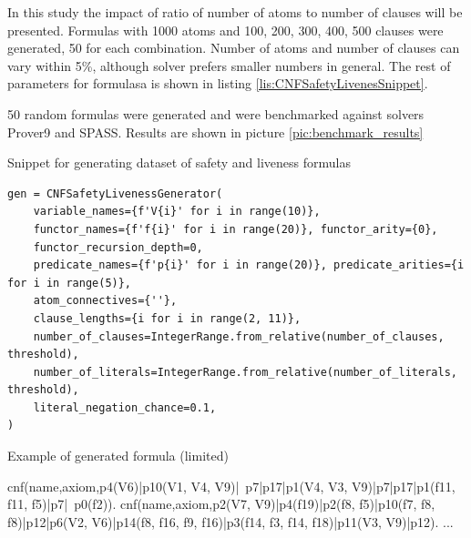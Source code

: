 In this study the impact of ratio of number of atoms to number of clauses will be presented.
Formulas with 1000 atoms and 100, 200, 300, 400, 500 clauses were generated, 50 for each combination. Number of atoms and number of clauses can vary within 5\%, although solver prefers smaller numbers in general. The rest of parameters for formulasa is shown in listing \ref{lis:CNFSafetyLivenesSnippet}.

50 random formulas were generated and were benchmarked against solvers Prover9 and SPASS. Results are shown in picture \ref{pic:benchmark_results}

\begin{listing}[ht]
  \caption{Snippet for generating dataset of safety and liveness formulas}
  \label{lis:CNFSafetyLivenesSnippet}
\begin{verbatim}
gen = CNFSafetyLivenessGenerator(
    variable_names={f'V{i}' for i in range(10)},
    functor_names={f'f{i}' for i in range(20)}, functor_arity={0},
    functor_recursion_depth=0,
    predicate_names={f'p{i}' for i in range(20)}, predicate_arities={i for i in range(5)},
    atom_connectives={''},
    clause_lengths={i for i in range(2, 11)},
    number_of_clauses=IntegerRange.from_relative(number_of_clauses, threshold),
    number_of_literals=IntegerRange.from_relative(number_of_literals, threshold),
    literal_negation_chance=0.1,
)
\end{verbatim}
\end{listing}

\begin{listing}[ht]
  \caption{Example of generated formula (limited)}
\begin{tptpcode}
% 
cnf(name,axiom,p4(V6)|p10(V1, V4, V9)|~p7|p17|p1(V4, V3, V9)|p7|p17|p1(f11, f11, f5)|p7|~p0(f2)).
cnf(name,axiom,p2(V7, V9)|p4(f19)|p2(f8, f5)|p10(f7, f8, f8)|p12|p6(V2, V6)|p14(f8, f16, f9, f16)|p3(f14, f3, f14, f18)|p11(V3, V9)|p12).
...
\end{tptpcode}
\end{listing}


